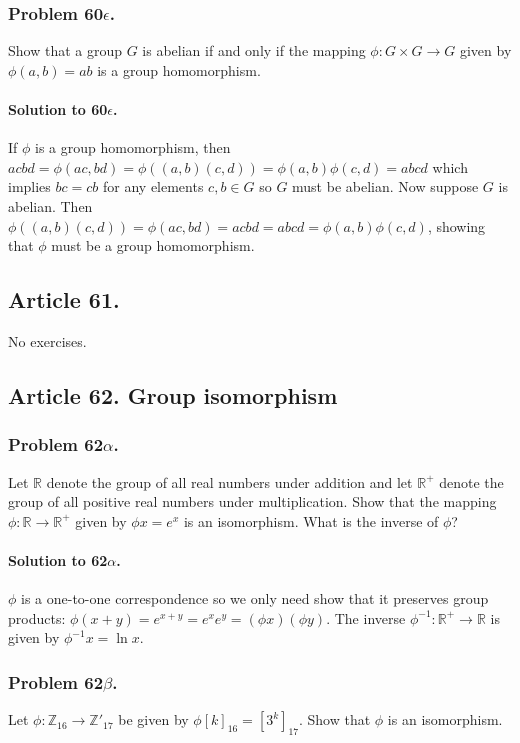 \subsubsection{Problem 60$\epsilon$.}
Show that a group $G$ is abelian if and only if the mapping $\phi : G \times G \rightarrow
G$ given by $\phi (a,b) = ab$ is a group homomorphism.

\paragraph*{Solution to 60$\epsilon$.}
If $\phi$ is a group homomorphism, then $acbd = \phi(ac,bd) = \phi((a,b)(c,d))
= \phi(a,b)\phi(c,d) = abcd$ which implies $bc = cb$ for any elements $c,b \in G$
so $G$ must be abelian. Now suppose $G$ is abelian. Then $\phi ((a,b)(c,d)) =
\phi (ac,bd) = acbd = abcd = \phi(a,b)\phi(c,d)$, showing that $\phi$ must be
a group homomorphism.

\subsection{Article 61.}

No exercises.

\subsection{Article 62. Group isomorphism}
\subsubsection{Problem 62$\alpha$.}
Let $\mathbb{R}$ denote the group of all real numbers under addition and let
$\mathbb{R}^+$ denote the group of all positive real numbers under multiplication.
Show that the mapping $\phi : \mathbb{R} \rightarrow \mathbb{R}^+$ given by
$\phi x = e^x$ is an isomorphism. What is the inverse of $\phi$?

\paragraph*{Solution to 62$\alpha$.}
$\phi$ is a one-to-one correspondence so we only need show that it preserves group products:
$\phi(x+y) = e^{x+y} = e^x e^y = (\phi x)(\phi y)$. The inverse $\phi^{-1}: \mathbb{R}^+
\rightarrow \mathbb{R}$ is given by $\phi^{-1} x = \ln x$.

\subsubsection{Problem 62$\beta$.}
Let $\phi : \mathbb{Z}_{16} \rightarrow \mathbb{Z'}_{17}$ be given by
$\phi [k]_{16} = [3^k]_{17}$. Show that $\phi$ is an isomorphism.

